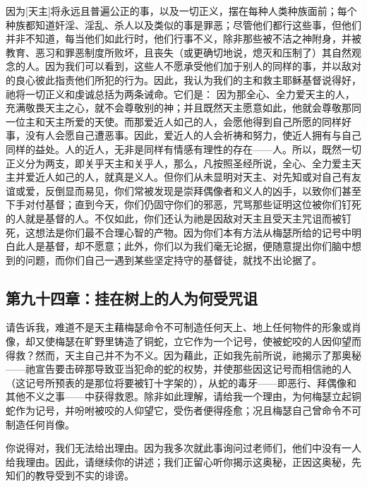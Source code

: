 因为[天主]将永远且普遍公正的事，以及一切正义，摆在每种人类种族面前；每个种族都知道奸淫、淫乱、杀人以及类似的事是罪恶；尽管他们都行这些事，但他们并非不知道，每当他们如此行时，他们行事不义，除非那些被不洁之神附身，并被教育、恶习和罪恶制度所败坏，且丧失（或更确切地说，熄灭和压制了）其自然观念的人。因为我们可以看到，这些人不愿承受他们加于别人的同样的事，并以敌对的良心彼此指责他们所犯的行为。因此，我认为我们的主和救主耶稣基督说得好，祂将一切正义和虔诚总括为两条诫命。它们是： 因为那全心、全力爱天主的人，充满敬畏天主之心，就不会尊敬别的神；并且既然天主愿意如此，他就会尊敬那同一位主和天主所爱的天使。而那爱近人如己的人，会愿他得到自己所愿的同样好事，没有人会愿自己遭恶事。因此，爱近人的人会祈祷和努力，使近人拥有与自己同样的益处。人的近人，无非是同样有情感有理性的存在——人。所以，既然一切正义分为两支，即关乎天主和关乎人，那么，凡按照圣经所说，全心、全力爱主天主并爱近人如己的人，就真是义人。但你们从未显明对天主、对先知或对自己有友谊或爱，反倒显而易见，你们常被发现是崇拜偶像者和义人的凶手，以致你们甚至下手对付基督；直到今天，你们仍固守你们的邪恶，咒骂那些证明这位被你们钉死的人就是基督的人。不仅如此，你们还认为祂是因敌对天主且受天主咒诅而被钉死，这想法是你们最不合理心智的产物。因为你们本有方法从梅瑟所给的记号中明白此人是基督，却不愿意；此外，你们以为我们毫无论据，便随意提出你们脑中想到的问题，而你们自己一遇到某些坚定持守的基督徒，就找不出论据了。\par


\subsection{第九十四章：挂在树上的人为何受咒诅}

 请告诉我，难道不是天主藉梅瑟命令不可制造任何天上、地上任何物件的形象或肖像，却又使梅瑟在旷野里铸造了铜蛇，立它作为一个记号，使被蛇咬的人因仰望而得救？然而，天主自己并不为不义。因为藉此，正如我先前所说，祂揭示了那奥秘——祂宣告要击碎那导致亚当犯命的蛇的权势，并使那些因这记号而相信祂的人（这记号所预表的是那位将要被钉十字架的），从蛇的毒牙——即恶行、拜偶像和其他不义之事——中获得救恩。除非如此理解，请给我一个理由，为何梅瑟立起铜蛇作为记号，并吩咐被咬的人仰望它，受伤者便得痊愈；况且梅瑟自己曾命令不可制造任何肖像。\par

 你说得对，我们无法给出理由。因为我多次就此事询问过老师们，他们中没有一人给我理由。因此，请继续你的讲述；我们正留心听你揭示这奥秘，正因这奥秘，先知们的教导受到不实的诽谤。\par

